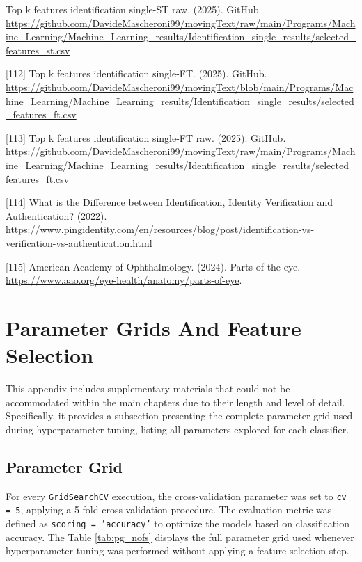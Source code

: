 \documentclass[12pt]{report}
\begin{document}
\begin{raggedright}
[111] Top k features identification single-ST raw. (2025). GitHub. \url{https://github.com/DavideMascheroni99/movingText/raw/main/Programs/Machine_Learning/Machine_Learning_results/Identification_single_results/selected_features_st.csv}

[112] Top k features identification single-FT. (2025). GitHub. \url{https://github.com/DavideMascheroni99/movingText/blob/main/Programs/Machine_Learning/Machine_Learning_results/Identification_single_results/selected_features_ft.csv}

[113] Top k features identification single-FT raw. (2025). GitHub. \url{https://github.com/DavideMascheroni99/movingText/raw/main/Programs/Machine_Learning/Machine_Learning_results/Identification_single_results/selected_features_ft.csv}

[114] What is the Difference between Identification, Identity Verification and Authentication? (2022). \url{https://www.pingidentity.com/en/resources/blog/post/identification-vs-verification-vs-authentication.html}

[115] American Academy of Ophthalmology. (2024). Parts of the eye. \url{https://www.aao.org/eye-health/anatomy/parts-of-eye}.

\end{raggedright}
\clearpage
\newpage

\appendix
\chapter{Parameter Grids And Feature Selection}
\label{subsec:param}


This appendix includes supplementary materials that could not be accommodated within the main chapters due to their length and level of detail. 
Specifically, it provides a subsection presenting the complete parameter grid used during hyperparameter tuning, listing all parameters explored for each classifier. 

\section{Parameter Grid}
For every \texttt{GridSearchCV} execution, the cross-validation parameter was set to \texttt{cv = 5}, applying a 5-fold cross-validation procedure.
The evaluation metric was defined as \texttt{scoring = 'accuracy'} to optimize the models based on classification accuracy.
The Table \ref{tab:pg_nofs} displays the full parameter grid used whenever hyperparameter tuning was performed without applying a feature selection step.
\end{document}
